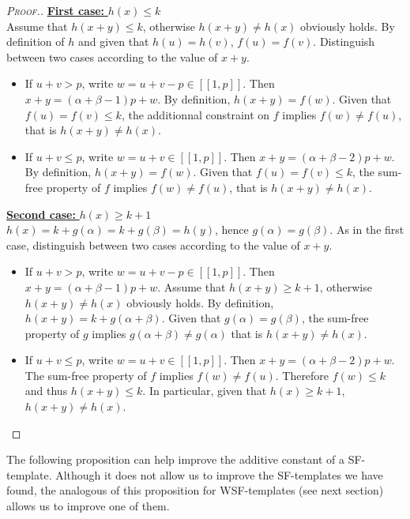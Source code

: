 \begin{proof}[\textsc{Proof.}]
\noindent \underline{\textbf{First case:} \(h(x) \leqslant k\)} \\
\qquad Assume that \(h(x+y) \leqslant k\), otherwise \(h(x + y) \neq h(x)\) obviously holds. By definition of \(h\) 
and given that \(h(u) = h(v)\), \(f(u) = f(v)\). Distinguish between two cases according to the value of \(x + y\).

\begin{itemize}
\item If \(u + v > p\), write \(w = u + v - p \in [\![1, p]\!]\). Then \(x + y = (\alpha + \beta - 1) p + w\). By definition, 
	\(h(x + y) = f(w)\). Given that \(f(u) = f(v) \leqslant k\), the additionnal constraint on \(f\) implies \(f(w) 
	\neq f(u)\), that is \(h(x + y) \neq h(x)\).
\item If \(u + v \leqslant p\), write \(w = u + v \in [\![1, p]\!]\). Then \(x+y = (\alpha + \beta- 2) p + w\). By definition, 
	\(h(x + y) = f(w)\). Given that \(f(u) = f(v) \leqslant k\), the sum-free property of \(f\) implies \(f(w) \neq f(u)\), 
	that is \(h(x + y) \neq h(x)\).
\end{itemize} 
  
\noindent \underline{\textbf{Second case:} \(h(x) \geqslant k + 1\)} \\
\qquad \(h(x) = k + g(\alpha) = 
k + g(\beta) = h(y)\), hence \(g(\alpha) = g(\beta)\). As in the first case, distinguish between two cases according 
to the value of \(x + y\).

\begin{itemize}
\item If \(u + v > p\), write \(w = u + v - p \in [\![1, p]\!]\). Then \(x + y = (\alpha + \beta - 1) p + w\). Assume that 
	\(h(x+y) \geqslant k + 1\),  otherwise \(h(x + y) \neq h(x)\) obviously holds. By definition, \(h(x + y) = k + g(\alpha + 
	\beta)\). Given that \(g(\alpha) = g(\beta)\), the sum-free property of \(g\) implies \(g(\alpha + \beta) 
	\neq g(\alpha)\) that is \(h(x + y) \neq h(x)\).
\item  If \(u + v \leqslant p\), write \(w = u + v \in [\![1, p]\!]\). Then \(x+y = (\alpha + \beta- 2) p + w\). The sum-free 
	property of \(f\) implies \(f(w) \neq f(u)\). Therefore \(f(w) \leqslant k\) and thus \(h(x + y) \leqslant k\). In particular,
	given that \(h(x) \geqslant k + 1\), \(h(x + y) \neq h(x)\).
\end{itemize}
\end{proof}

The following proposition can help improve the additive constant of a SF-template. Although it does not allow us to 
improve the SF-templates we have found, the analogous of this proposition for WSF-templates (see next section) 
allows us to improve one of them.

